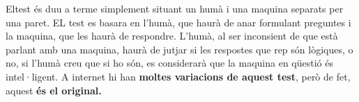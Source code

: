 Eltest és duu a terme simplement situant un humà i una maquina separats per una paret. EL test es basara en l'humà, que haurà de anar formulant preguntes i la maquina, que les haurà de respondre. L'humà, al ser inconsient de que està parlant amb una maquina, haurà de jutjar si les respostes que rep són lògiques, o no, si l'humà creu que si ho són, es considerarà que la maquina en qüestió és intel·ligent. A internet hi han \textbf{moltes variacions de aquest test}, però de fet, aquest \textbf{és el original.} \cite{TurTest} 

























